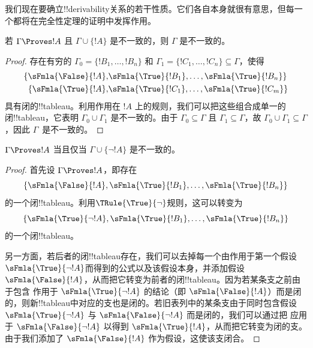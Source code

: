 \documentclass[../../../include/open-logic-section]{subfiles}
\begin{document}
      {}
      {}


我们现在要确立!!{derivability}关系的若干性质。它们各自本身就很有意思，但每一个都将在完全性定理的证明中发挥作用。

\begin{prop}
  若 $\Gamma \Proves !A$ 且 $\Gamma \cup \{!A\}$ 是不一致的，则 $\Gamma$ 是不一致的。
\end{prop}

\begin{proof}
存在有穷的 $\Gamma_0 = \{!B_1, \dots, !B_n\}$ 和 $\Gamma_1
  =\{!C_1, \dots, !C_n\} \subseteq \Gamma$，使得
  \begin{align*}
    \{\sFmla{\False}{!A}, &
    \sFmla{\True}{!B_1}, \dots, \sFmla{\True}{!B_n}\} \\
    \{\sFmla{\True}{!A}, &
    \sFmla{\True}{!C_1}, \dots, \sFmla{\True}{!C_m}\}
  \end{align*}
  具有闭的!!{tableau}。利用作用在 $!A$ 上的\Cut{}规则，我们可以把这些组合成单一的闭!!{tableau}，它表明 $\Gamma_0
  \cup \Gamma_1$ 是不一致的。由于 $\Gamma_0
  \subseteq \Gamma$ 且 $\Gamma_1 \subseteq \Gamma$，故 $\Gamma_0 \cup
  \Gamma_1 \subseteq \Gamma$，因此 $\Gamma$~是不一致的。
\end{proof}

\begin{prop}
$\Gamma \Proves !A$ 当且仅当 $\Gamma \cup \{\lnot !A\}$ 是不一致的。
\end{prop}

\begin{proof}
首先设 $\Gamma \Proves !A$，即存在
\[
\{\sFmla{\False}{!A},
\sFmla{\True}{!B_1}, \dots, \sFmla{\True}{!B_n}\}
\]
的一个闭!!{tableau}。利用$\TRule{\True}{\lnot}$规则，这可以转变为
\[
\{\sFmla{\True}{\lnot !A},
\sFmla{\True}{!B_1}, \dots, \sFmla{\True}{!B_n}\}
\]
的一个闭!!{tableau}。

另一方面，若后者的闭!!{tableau}存在，我们可以去掉每一个由\TRule{\True}{\lnot}作用于第一个假设~$\sFmla{\True}{\lnot !A}$而得到的公式以及该假设本身，并添加假设 $\sFmla{\False}{!A}$，从而把它转变为前者的闭!!{tableau}。因为若某条支之前由于包含 \TRule{\True}{\lnot} 作用于 $\sFmla{\True}{\lnot !A}$ 的结论（即 $\sFmla{\False}{!A}$）而是闭的，则新!!{tableau}中对应的支也是闭的。若旧表列中的某条支由于同时包含假设 $\sFmla{\True}{\lnot !A}$ 与 $\sFmla{\False}{\lnot
  !A}$ 而是闭的，我们可以通过把\TRule{\False}{\lnot} 应用于 $\sFmla{\False}{\lnot !A}$ 以得到
$\sFmla{\True}{!A}$，从而把它转变为闭的支。由于我们添加了
$\sFmla{\False}{!A}$ 作为假设，这使该支闭合。
\end{proof}
\end{document}
